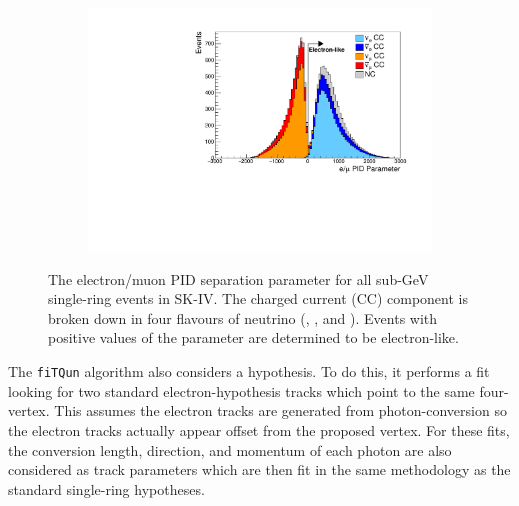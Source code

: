 \begin{figure}[h]
  \begin{subfigure}[t]{0.9\textwidth}
    \includegraphics[width=\textwidth, trim={0mm 0mm 0mm 0mm}, clip, page=1]{Figures/Simulations/PIDParameter.pdf}
  \end{subfigure}
  \caption{The electron/muon PID separation parameter for all sub-GeV single-ring events in SK-IV. The charged current (CC) component is broken down in four flavours of neutrino (\quickmath{\nu_{\mu}}, \quickmath{\bar{\nu}_{\mu}},  and ). Events with positive values of the parameter are determined to be electron-like.}
  \label{fig:Simulations_EMUPIDParamDistribution}
\end{figure}

The \texttt{fiTQun} algorithm also considers a  hypothesis. To do this, it performs a fit looking for two standard electron-hypothesis tracks which point to the same four-vertex. This assumes the electron tracks are generated from photon-conversion so the electron tracks actually appear offset from the proposed  vertex. For these fits, the conversion length, direction, and momentum of each photon are also considered as track parameters which are then fit in the same methodology as the standard single-ring hypotheses. 

